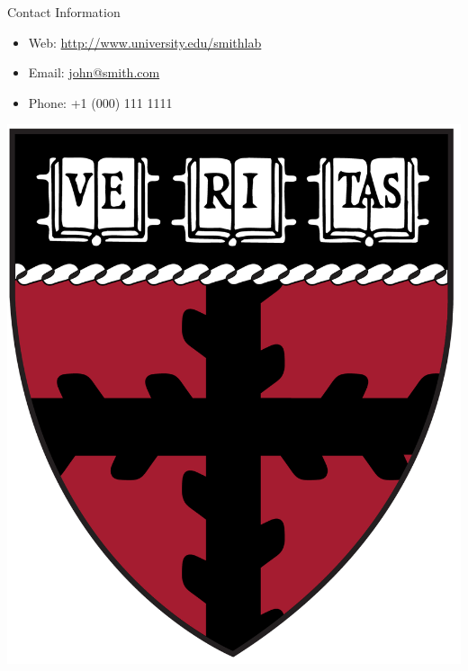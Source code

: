 \documentclass[final]{beamer}
\newlength{\onecolwid}
\begin{document}
\begin{frame}[t]
\begin{columns}[t]
\begin{column}{\onecolwid}

\begin{alertblock}{Contact Information}

\begin{itemize}
\item Web: \href{http://www.university.edu/smithlab}{http://www.university.edu/smithlab}
\item Email: \href{mailto:john@smith.com}{john@smith.com}
\item Phone: +1 (000) 111 1111
\end{itemize}

\end{alertblock}

\begin{center}
\includegraphics[width=0.2\linewidth]{seas-rgb.png}
\end{center}


\end{column} %

\end{columns} %

\end{frame} %
\end{document}
